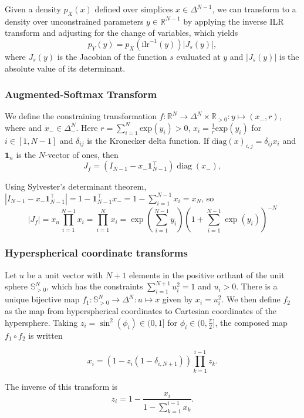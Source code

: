 \documentclass[11pt]{article}
\newcommand{\abs}[1]{\left| #1 \right|}
\newcommand{\absdet}[1]{\abs{#1}}
\begin{document}
Given a density $p_X(x)$ defined over simplices $x \in \Delta^{N-1}$,
we can transform to a density over unconstrained parameters $y \in
\mathbb{R}^{N-1}$ by applying the inverse ILR transform and adjusting
for the change of variables, which yields
\[
  p_Y(y) = p_X(\textrm{ilr}^{-1}(y)) \absdet{J_{s}(y)},
\]
where $J_{s}(y)$ is the Jacobian of the function $s$ evaluated at $y$
and $\absdet{J_s(y)}$ is the absolute value of its determinant.

\subsubsection{Augmented-Softmax Transform}
We define the constraining transformation
$f: \mathbb{R}^N \to \Delta^{N} \times \mathbb{R}_{>0}: y \mapsto
(x_-, r)$, where and $x_{-} \in \Delta_{-}^N$. Here $r = \sum_{i=1}^N \textrm{exp}(y_i) > 0$,
$x_i = \frac{1}{r} \textrm{exp}(y_i)$ for $i \in [1, N-1]$ and $\delta_{ij}$ is the Kronecker delta function. If $\mathrm{diag}(x)_{i, j} = \delta_{ij} x_i$ and $\boldsymbol{1}_n$ is the $N$-vector of ones, then
\[
  J_f = (I_{N-1} - x_- \boldsymbol{1}_{N-1}^\top) \operatorname{diag}(x_-),
\] 

Using Sylvester's determinant theorem,
$|I_{N-1} - x_- \boldsymbol{1}_{N-1}^\top| = 1 -
\boldsymbol{1}_{N-1}^\top x_- = 1 - \sum_{i=1}^{N-1} x_i = x_N$, so
$$ |J_f| = x_n \prod_{i=1}^{N-1} x_i = \prod_{i=1}^{N} x_i = \exp\left(\sum_{i=1}^{N-1} y_i\right) \left(1 + \sum_{i=1}^{N-1} \exp(y_i)\right)^{-N}$$

\subsubsection{Hyperspherical coordinate transforms}

Let $u$ be a unit vector with $N+1$ elements in the positive orthant of the unit sphere $\mathbb{S}_{>0}^N$, which has the constraints $\sum_{i=1}^{N+1} u_i^2 = 1$ and $u_i > 0$.
There is a unique bijective map $f_1\colon \mathbb{S}_{>0}^N \to \Delta^N \colon u \mapsto x$ given by $x_i = u_i^2$.
We then define $f_2$ as the map from hyperspherical coordinates to Cartesian coordinates of the hypersphere.
Taking $z_i = \sin^2(\phi_i) \in (0, 1]$ for $\phi_i \in (0, \frac{\pi}{2}]$, the composed map $f_1 \circ f_2$ is written

\[
  x_i = (1 - z_i (1 - \delta_{i,N+1})) \prod_{k=1}^{i-1} z_k.
\]

The inverse of this transform is
$$z_i = 1 - \frac{x_i}{1 - \sum_{k=1}^{i - 1} x_k}.$$
\end{document}

